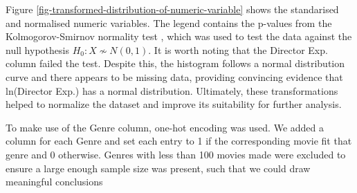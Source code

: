         Figure \ref*{fig-transformed-distribution-of-numeric-variable} shows the
        standarised and normalised numeric variables. The legend contains the p-values
        from the Kolmogorov-Smirnov normality test \cite*{KStest}, which was used to
        test the data against the null hypothesis $H_{0}: X \not\sim N(0,1)$. It is
        worth noting that the Director Exp. column failed the test. Despite this, the histogram follows a
        normal distribution curve and there appears to be missing data, providing convincing evidence that ln(Director Exp.)
        has a normal distribution. Ultimately, these transformations helped to normalize
        the dataset and improve its suitability for further analysis.

        To make use of the Genre column, one-hot encoding was used.
        We added a column for each Genre and set each entry to 1 if the corresponding movie
            fit that genre and 0 otherwise.
        Genres with less than 100 movies made were excluded to ensure a large enough sample size
            was present, such that we could draw meaningful conclusions